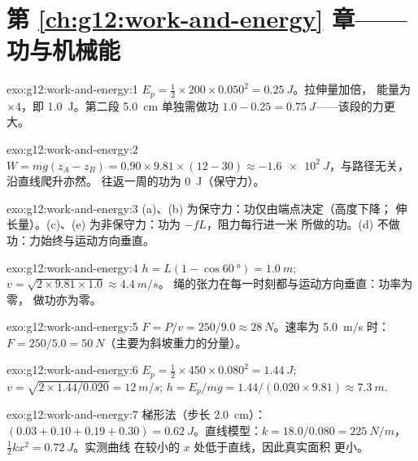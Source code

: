 \section*{第 \ref{ch:g12:work-and-energy} 章——功与机械能}

\begin{solution}{exo:g12:work-and-energy:1}
$E_p = \tfrac12 \times 200 \times 0.050^2 = \qty{0.25}{J}$。拉伸量加倍，
能量为 $\times 4$，即 \qty{1.0}{J}。第二段 \qty{5.0}{cm}
单独需做功 $1.0 - 0.25 = \qty{0.75}{J}$——该段的力更大。
\end{solution}

\begin{solution}{exo:g12:work-and-energy:2}
$W = mg(z_A - z_B) = 0.90 \times 9.81 \times (12 - 30) \approx
\qty{-1.6e2}{J}$，与路径无关，沿直线爬升亦然。
往返一周的功为 \qty{0}{J}（保守力）。
\end{solution}

\begin{solution}{exo:g12:work-and-energy:3}
(a)、(b) 为保守力：功仅由端点决定（高度下降；
伸长量）。(c)、(e) 为非保守力：功为 $-fL$，阻力每行进一米
所做的功。(d) 不做功：力始终与运动方向垂直。
\end{solution}

\begin{solution}{exo:g12:work-and-energy:4}
$h = L(1 - \cos\qty{60}{\degree}) = \qty{1.0}{m}$;
$v = \sqrt{2 \times 9.81 \times 1.0} \approx \qty{4.4}{m/s}$。
绳的张力在每一时刻都与运动方向垂直：功率为零，
做功亦为零。
\end{solution}

\begin{solution}{exo:g12:work-and-energy:5}
$F = P/v = 250/9.0 \approx \qty{28}{N}$。速率为 \qty{5.0}{m/s} 时：
$F = 250/5.0 = \qty{50}{N}$（主要为斜坡重力的分量）。
\end{solution}

\begin{solution}{exo:g12:work-and-energy:6}
$E_p = \tfrac12 \times 450 \times 0.080^2 = \qty{1.44}{J}$;
$v = \sqrt{2 \times 1.44/0.020} = \qty{12}{m/s}$;
$h = E_p/mg = 1.44/(0.020 \times 9.81) \approx \qty{7.3}{m}$.
\end{solution}

\begin{solution}{exo:g12:work-and-energy:7}
梯形法（步长 \qty{2.0}{cm}）：$(0.03 + 0.10 + 0.19 + 0.30) =
\qty{0.62}{J}$。直线模型：$k = 18.0/0.080 =
\qty{225}{N/m}$，$\tfrac12 kx^2 = \qty{0.72}{J}$。实测曲线
在较小的 $x$ 处低于直线，因此真实面积
更小。
\end{solution}

